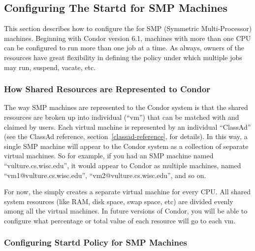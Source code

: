 \subsection{\label{sec:Configuring-SMP}
Configuring The Startd for SMP Machines}

This section describes how to configure the  for SMP
(Symmetric Multi-Processor) machines.
Beginning with Condor version 6.1, machines with more than one CPU can
be configured to run more than one job at a time.
As always, owners of the resources have great flexibility in defining
the policy under which multiple jobs may run, suspend, vacate, etc.  

\subsubsection{\label{sec:How-Resources-Represented}
How Shared Resources are Represented to Condor}

The way SMP machines are represented to the Condor system is that
the shared resources are broken up into individual  (``vm'') that can be matched with and claimed by users.
Each virtual machine is represented by an individual ``ClassAd''
(see the ClassAd reference, section~\ref{classad-reference}, for
details). 
In this way, a single SMP machine will appear to the Condor system as
a collection of separate virtual machines.  
So for example, if you had an SMP machine named
``vulture.cs.wisc.edu'', it would appear to Condor as multiple
machines, named ``vm1@vulture.cs.wisc.edu'',
``vm2@vulture.cs.wisc.edu'', and so on.

For now, the  simply creates a separate virtual machine
for every CPU.
All shared system resources (like RAM, disk space, swap space, etc)
are divided evenly among all the virtual machines.
In future versions of Condor, you will be able to configure what
percentage or total value of each resource will go to each vm.  

\subsubsection{\label{sec:Config-SMP-Policy}
Configuring Startd Policy for SMP Machines}

